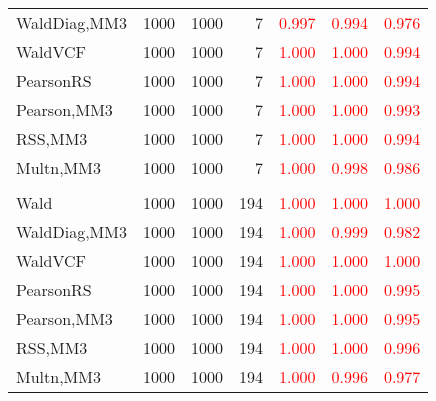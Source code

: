\documentclass[
]{article}
\begin{document}
\begin{table}[H]
{\begin{tabular}[t]{lrrrrrr}
\hspace{1em}WaldDiag,MM3 & 1000 & 1000 & 7 & \textcolor{red}{0.997} & \textcolor{red}{0.994} & \textcolor{red}{0.976}\\
\hspace{1em}WaldVCF & 1000 & 1000 & 7 & \textcolor{red}{1.000} & \textcolor{red}{1.000} & \textcolor{red}{0.994}\\
\hspace{1em}PearsonRS & 1000 & 1000 & 7 & \textcolor{red}{1.000} & \textcolor{red}{1.000} & \textcolor{red}{0.994}\\
\hspace{1em}Pearson,MM3 & 1000 & 1000 & 7 & \textcolor{red}{1.000} & \textcolor{red}{1.000} & \textcolor{red}{0.993}\\
\hspace{1em}RSS,MM3 & 1000 & 1000 & 7 & \textcolor{red}{1.000} & \textcolor{red}{1.000} & \textcolor{red}{0.994}\\
\hspace{1em}Multn,MM3 & 1000 & 1000 & 7 & \textcolor{red}{1.000} & \textcolor{red}{0.998} & \textcolor{red}{0.986}\\
\addlinespace[0.3em]
\multicolumn{7}{l}{\textbf{3F 15V}}\\
\hspace{1em}Wald & 1000 & 1000 & 194 & \textcolor{red}{1.000} & \textcolor{red}{1.000} & \textcolor{red}{1.000}\\
\hspace{1em}WaldDiag,MM3 & 1000 & 1000 & 194 & \textcolor{red}{1.000} & \textcolor{red}{0.999} & \textcolor{red}{0.982}\\
\hspace{1em}WaldVCF & 1000 & 1000 & 194 & \textcolor{red}{1.000} & \textcolor{red}{1.000} & \textcolor{red}{1.000}\\
\hspace{1em}PearsonRS & 1000 & 1000 & 194 & \textcolor{red}{1.000} & \textcolor{red}{1.000} & \textcolor{red}{0.995}\\
\hspace{1em}Pearson,MM3 & 1000 & 1000 & 194 & \textcolor{red}{1.000} & \textcolor{red}{1.000} & \textcolor{red}{0.995}\\
\hspace{1em}RSS,MM3 & 1000 & 1000 & 194 & \textcolor{red}{1.000} & \textcolor{red}{1.000} & \textcolor{red}{0.996}\\
\hspace{1em}Multn,MM3 & 1000 & 1000 & 194 & \textcolor{red}{1.000} & \textcolor{red}{0.996} & \textcolor{red}{0.977}\\
\bottomrule
\end{tabular}}
\endgroup{}
\end{table}
\end{document}
